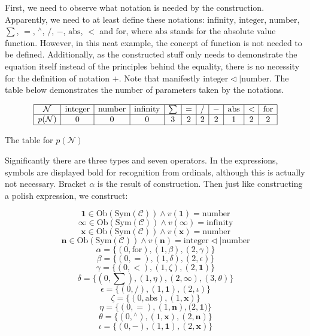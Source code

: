 \documentclass{article}
\begin{document}
First, we need to observe what notation is needed by the construction. Apparently, we need to at least define these notations: \(\text{infinity}\), \(\text{integer}\), \(\text{number}\),\textit{  }\textit{ \(\sum\)}, \(=\), \({}^{\wedge}\), \(/\), \(-\), \(\text{abs}\), \(<\) and \(\text{for}\), where \(\text{abs}\) stands for the absolute value function. However, in this neat example, the concept of function is not needed to be defined. Additionally, as the constructed stuff only needs to demonstrate the equation itself instead of the principles behind the equality, there is no necessity for the definition of notation \(+\). Note that manifestly \(\text{integer} \triangleleft | \text{number}\). The table below demonstrates the number of parameters taken by the notations.

\begin{table}
	\centering
	\[\begin{array}{|c|c|c|c|c|c|c|c|c|c|c|}
		\hline
		\mathcal{N} & \text{integer} & \text{number} & \text{infinity} & \sum  & = & / & - & \text{abs} & < & \text{for} \\
		\hline
		\mathit{p}(\mathcal{N}) & 0 & 0 & 0 & 3 & 2 & 2 & 2 & 1 & 2 & 2 \\
		\hline
	\end{array}\]
	\caption{The table for $\mathit{p}(\mathcal{N})$}
\end{table}

Significantly there are three types and seven operators. In the expressions, symbols are displayed bold for recognition from ordinals, although this
is actually not necessary. Bracket \(\alpha\) is the result of construction. Then just like constructing a polish expression, we construct:

\[\pmb{1}\in \text{Ob}(\text{Sym}(\mathcal{C}))\land \mathit{v}(\pmb{1})=\text{number}\]
\[\pmb{\infty }\in \text{Ob}(\text{Sym}(\mathcal{C}))\land \mathit{v}(\pmb{\infty })=\text{infinity}\]
\[\pmb{x}\in \text{Ob}(\text{Sym}(\mathcal{C}))\land \mathit{v}(\pmb{x})=\text{number}\]
\[\pmb{n}\in \text{Ob}(\text{Sym}(\mathcal{C}))\land \mathit{v}(\pmb{n})=\text{integer}\triangleleft |\text{number}\]
\[\alpha =\{(0,\text{for}),(1,\beta ),(2,\gamma )\}\]
\[\beta =\{(0,=),(1,\delta ),(2,\epsilon )\}\]
\[\gamma =\{(0,<),(1,\zeta ),(2,\pmb{1})\}\]
\[\delta =\{(0,\sum ),(1,\eta ),(2,\pmb{\infty }), (3,\theta )\}\]
\[\epsilon =\{(0,/),(1,\pmb{1}),(2,\iota )\}\]
\[\zeta =\{(0,\text{abs}),(1,\pmb{x})\}\]
\[\eta =\{(0,=),(1,\pmb{n}),(2,\pmb{1}\pmb{)}\pmb{\}}\]
\[\theta =\{(0,{}^{\wedge}),(1,\pmb{x}),(2,\pmb{n})\}\]
\[\iota =\{(0,-),(1,\pmb{1}),(2,\pmb{x})\}\]
\end{document}
